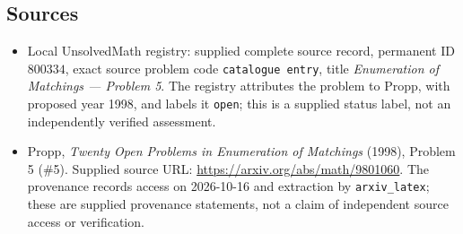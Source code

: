 \documentclass[11pt]{article}
\begin{document}
\subsection{Sources}
\begin{itemize}
\item Local UnsolvedMath registry: supplied complete source record, permanent ID \(800334\), exact source problem code \texttt{catalogue entry}, title \emph{Enumeration of Matchings --- Problem 5}. The registry attributes the problem to Propp, with proposed year 1998, and labels it \texttt{open}; this is a supplied status label, not an independently verified assessment.
\item Propp, \emph{Twenty Open Problems in Enumeration of Matchings} (1998), Problem 5 (\#5). Supplied source URL: \url{https://arxiv.org/abs/math/9801060}. The provenance records access on 2026-10-16 and extraction by \texttt{arxiv\_latex}; these are supplied provenance statements, not a claim of independent source access or verification.
\end{itemize}
\end{document}
